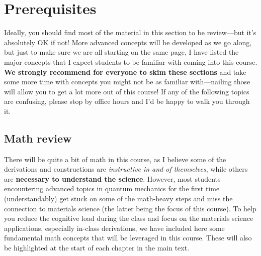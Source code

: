 

%

\chapter{Prerequisites} \label{ch:prereq}

Ideally, you should find most of the material in this section to be review---but it's absolutely OK if not!
More advanced concepts will be developed as we go along, but just to make sure we are all starting on the same page, I have listed the major concepts that I expect students to be familiar with coming into this course. 
\textbf{We strongly recommend for everyone to skim these sections} and take some more time with concepts you might not be as familiar with---nailing those will allow you to get a lot more out of this course! 
If any of the following topics are confusing, please stop by office hours and I'd be happy to walk you through it.


\section{Math review} \label{sec:math}

There will be quite a bit of math in this course, as I believe some of the derivations and constructions are \emph{instructive in and of themselves}, while others are \textbf{necessary to understand the science}.
However, most students encountering advanced topics in quantum mechanics for the first time (understandably) get stuck on some of the math-heavy steps and miss the connection to materials science (the latter being the focus of this course).
To help you reduce the cognitive load during the class and focus on the materials science applications, especially in-class derivations, we have included here some fundamental math concepts that will be leveraged in this course.
These will also be highlighted at the start of each chapter in the main text.


